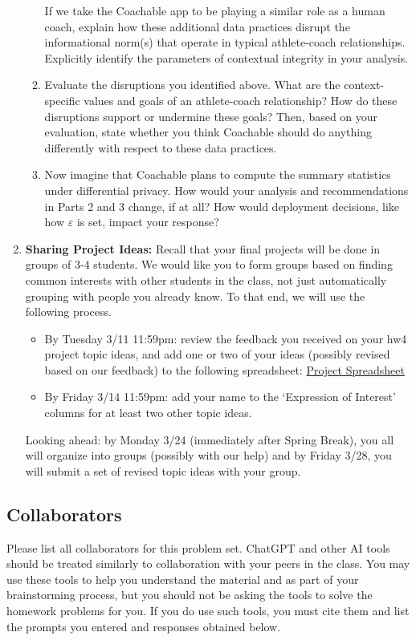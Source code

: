 \documentclass[11pt]{article}
\begin{document}
\begin{enumerate}[leftmargin=*]
\begin{enumerate}
    If we take the Coachable app to be playing a similar role as a human coach, explain how these additional data practices disrupt the informational norm(s) that operate in typical athlete-coach relationships. Explicitly identify the parameters of contextual integrity in your analysis.

    \item Evaluate the disruptions you identified above. What are the context-specific values and goals of an athlete-coach relationship? How do these disruptions support or undermine these goals? Then, based on your evaluation, state whether you think Coachable should do anything differently with respect to these data practices. 

    \item Now imagine that Coachable plans to compute the summary statistics under differential privacy. How would your analysis and recommendations in Parts 2 and 3 change, if at all? How would deployment decisions, like how $\varepsilon$ is set, impact your response?

    \end{enumerate}

\item \textbf{Sharing Project Ideas:}
Recall that your final projects will be done in groups of 3-4 students. We would like you to form groups based on finding common interests with other students in the class, not just automatically grouping with people you already know. To that end, we will use the following process.
\begin{itemize}
    \item By Tuesday 3/11 11:59pm: review the feedback you received on your hw4 project topic ideas, and add one or two of your ideas (possibly revised based on our feedback) to the following spreadsheet: \href{https://docs.google.com/spreadsheets/d/1gxPtxZU835YJ_yZbDQtneGnusvXHWax4sDi-fodu2wA/edit?gid=0#gid=0}{Project Spreadsheet} 
    \item By Friday 3/14 11:59pm: add your name to the `Expression of Interest' columns for at least two other topic ideas.
\end{itemize}
Looking ahead: by Monday 3/24 (immediately after Spring Break), you all will organize into groups (possibly with our help) and by Friday 3/28, you will submit a set of revised topic ideas with your group.
\end{enumerate}

\subsection*{Collaborators}
Please list all collaborators for this problem set. ChatGPT and other AI tools should be treated similarly to collaboration with your peers in the 
class.  You may use these tools to help you understand the material and as part of your 
brainstorming process, but you should not be asking the tools to solve the homework problems 
for you. If you do use such tools, you must cite them and  list the 
prompts you entered and responses obtained below.
\end{document}
